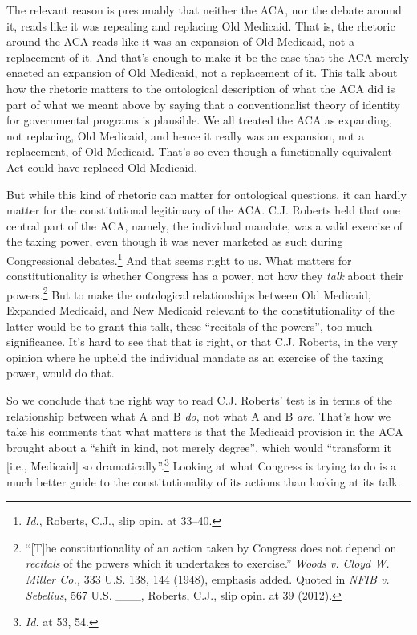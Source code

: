 \documentclass[
  11pt,
  letterpaper,
  DIV=11,
  numbers=noendperiod,
  twoside]{scrartcl}
\begin{document}
The relevant reason is presumably that neither the ACA, nor the debate
around it, reads like it was repealing and replacing Old Medicaid. That
is, the rhetoric around the ACA reads like it was an expansion of Old
Medicaid, not a replacement of it. And that's enough to make it be the
case that the ACA merely enacted an expansion of Old Medicaid, not a
replacement of it. This talk about how the rhetoric matters to the
ontological description of what the ACA did is part of what we meant
above by saying that a conventionalist theory of identity for
governmental programs is plausible. We all treated the ACA as expanding,
not replacing, Old Medicaid, and hence it really was an expansion, not a
replacement, of Old Medicaid. That's so even though a functionally
equivalent Act could have replaced Old Medicaid.

But while this kind of rhetoric can matter for ontological questions, it
can hardly matter for the constitutional legitimacy of the ACA. C.J.
Roberts held that one central part of the ACA, namely, the individual
mandate, was a valid exercise of the taxing power, even though it was
never marketed as such during Congressional debates.\footnote{\emph{Id.},
  Roberts, C.J., slip opin. at 33--40.} And that seems right to us. What
matters for constitutionality is whether Congress has a power, not how
they \emph{talk} about their powers.\footnote{``{[}T{]}he
  constitutionality of an action taken by Congress does not depend on
  \emph{recitals} of the powers which it undertakes to exercise.''
  \emph{Woods v. Cloyd W. Miller Co.,} 333 U.S. 138, 144 (1948),
  emphasis added. Quoted in \emph{NFIB v. Sebelius}, 567 U.S. \_\_\_,
  Roberts, C.J., slip opin. at 39 (2012).} But to make the ontological
relationships between Old Medicaid, Expanded Medicaid, and New Medicaid
relevant to the constitutionality of the latter would be to grant this
talk, these ``recitals of the powers'', too much significance. It's hard
to see that that is right, or that C.J. Roberts, in the very opinion
where he upheld the individual mandate as an exercise of the taxing
power, would do that.

So we conclude that the right way to read C.J. Roberts' test is in terms
of the relationship between what A and B \emph{do}, not what A and B
\emph{are}. That's how we take his comments that what matters is that
the Medicaid provision in the ACA brought about a ``shift in kind, not
merely degree'', which would ``transform it {[}i.e., Medicaid{]} so
dramatically''.\footnote{\emph{Id.} at 53, 54.} Looking at what Congress
is trying to do is a much better guide to the constitutionality of its
actions than looking at its talk.
\end{document}
